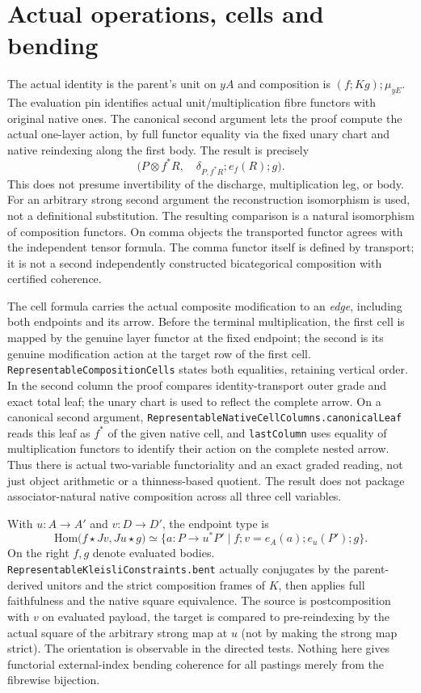 \documentclass[11pt]{article}
\newcommand{\nm}[1]{\nolinkurl{#1}}
\begin{document}
\section*{Actual operations, cells and bending}
The actual identity is the parent's unit on $yA$ and composition is
$(f;Kg);\mu_{yE}$. The evaluation pin identifies actual unit/multiplication
fibre functors with original native ones. The canonical second argument
lets the proof compute the actual one-layer action, by full functor
equality via the fixed unary chart and native reindexing along the first
body. The result is precisely
\[
  \bigl(P\otimes f^*R,\quad
        \delta_{P,f^*R}; e_f(R);g\bigr).
\]
This does not presume invertibility of the discharge, multiplication leg,
or body. For an arbitrary strong second argument the reconstruction
isomorphism is used, not a definitional substitution. The resulting
comparison is a natural isomorphism of composition functors. On comma
objects the transported functor agrees with the independent tensor formula.
The comma functor itself is defined by transport; it is not a second
independently constructed bicategorical composition with certified
coherence.

The cell formula carries the actual composite modification to an
\emph{edge}, including both endpoints and its arrow. Before the terminal
multiplication, the first cell is mapped by the genuine layer functor
at the fixed endpoint; the second is its genuine modification action at
the target row of the first cell. \nm{RepresentableCompositionCells}
states both equalities, retaining vertical order. In the second column
the proof compares identity-transport outer grade and exact total leaf;
the unary chart is used to reflect the complete arrow. On a canonical
second argument, \nm{RepresentableNativeCellColumns.canonicalLeaf}
reads this leaf as $f^*$ of the given native cell, and
\nm{lastColumn} uses equality of multiplication functors to identify
their action on the complete nested arrow. Thus there is actual
two-variable functoriality and an exact graded reading, not just object
arithmetic or a thinness-based quotient. The result does not package
associator-natural native composition across all three cell variables.

With $u:A\to A'$ and $v:D\to D'$, the endpoint type is
\[
 \mathrm{Hom}\bigl(f\star Jv,Ju\star g\bigr)
 \simeq
 \{a:P\to u^*P'\mid f;v=e_A(a);e_u(P');g\}.
\]
On the right $f,g$ denote evaluated bodies. \nm{RepresentableKleisliConstraints.bent}
actually conjugates by the parent-derived unitors and the strict
composition frames of $K$, then applies full faithfulness and the native
square equivalence. The source is postcomposition with $v$ on evaluated
payload, the target is compared to pre-reindexing by the actual square
of the arbitrary strong map at $u$ (not by making the strong map strict).
The orientation is observable in the directed tests. Nothing here gives
functorial external-index bending coherence for all pastings merely from
the fibrewise bijection.
\end{document}
